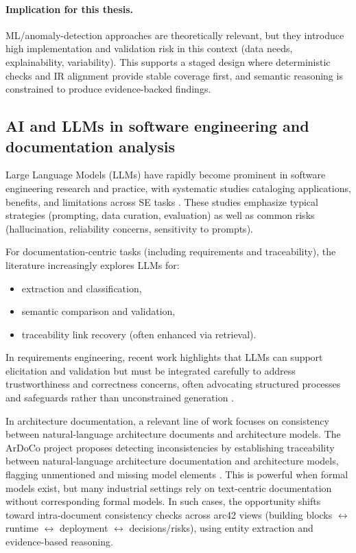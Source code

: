 \paragraph{Implication for this thesis.}
ML/anomaly-detection approaches are theoretically relevant, but they introduce high implementation and validation risk in this context (data needs, explainability, variability). This supports a staged design where deterministic checks and IR alignment provide stable coverage first, and semantic reasoning is constrained to produce evidence-backed findings.

\subsection{AI and LLMs in software engineering and documentation analysis}
Large Language Models (LLMs) have rapidly become prominent in software engineering research and practice, with systematic studies cataloging applications, benefits, and limitations across SE tasks \cite{llm4se_slr,llm4se_survey}. These studies emphasize typical strategies (prompting, data curation, evaluation) as well as common risks (hallucination, reliability concerns, sensitivity to prompts).

For documentation-centric tasks (including requirements and traceability), the literature increasingly explores LLMs for:
\begin{itemize}
    \item extraction and classification,
    \item semantic comparison and validation,
    \item traceability link recovery (often enhanced via retrieval).
\end{itemize}

In requirements engineering, recent work highlights that LLMs can support elicitation and validation but must be integrated carefully to address trustworthiness and correctness concerns, often advocating structured processes and safeguards rather than unconstrained generation \cite{llm_requirements_engineering}.

In architecture documentation, a relevant line of work focuses on consistency between natural-language architecture documents and architecture models. The ArDoCo project proposes detecting inconsistencies by establishing traceability between natural-language architecture documentation and architecture models, flagging unmentioned and missing model elements \cite{ardoco_icsa23_inconsistency_detection}. This is powerful when formal models exist, but many industrial settings rely on text-centric documentation without corresponding formal models. In such cases, the opportunity shifts toward intra-document consistency checks across arc42 views (building blocks $\leftrightarrow$ runtime $\leftrightarrow$ deployment $\leftrightarrow$ decisions/risks), using entity extraction and evidence-based reasoning.

